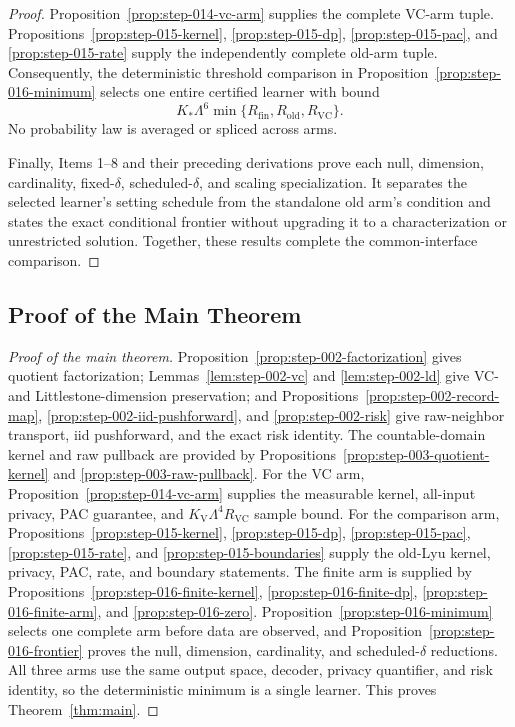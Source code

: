 \begin{proof}
Proposition~\ref{prop:step-014-vc-arm} supplies the complete
VC-arm tuple. Propositions~\ref{prop:step-015-kernel},
\ref{prop:step-015-dp}, \ref{prop:step-015-pac}, and
\ref{prop:step-015-rate} supply the independently complete old-arm tuple.
Consequently, the deterministic threshold comparison in
Proposition~\ref{prop:step-016-minimum} selects one entire certified learner
with bound
\[
 K_*\Lambda^6\min\{R_{\mathrm{fin}},R_{\mathrm{old}},R_{\mathrm{VC}}\}.
\]
No probability law is averaged or spliced across arms.

Finally, Items 1--8 and their preceding derivations prove each null,
dimension, cardinality, fixed-\(\delta\), scheduled-\(\delta\), and scaling
specialization. It separates the selected learner's setting schedule from
the standalone old arm's condition and states the exact conditional frontier
without upgrading it to a characterization or unrestricted solution. Together,
these results complete the common-interface comparison.



\end{proof}

\subsection{Proof of the Main Theorem}\label{app:main-proof}

\begin{proof}[Proof of the main theorem]
Proposition~\ref{prop:step-002-factorization} gives quotient factorization;
Lemmas~\ref{lem:step-002-vc} and \ref{lem:step-002-ld} give VC- and
Littlestone-dimension preservation; and
Propositions~\ref{prop:step-002-record-map},
\ref{prop:step-002-iid-pushforward}, and \ref{prop:step-002-risk} give
raw-neighbor transport, iid pushforward, and the exact risk identity. The
countable-domain kernel and raw pullback are
provided by Propositions~\ref{prop:step-003-quotient-kernel} and
\ref{prop:step-003-raw-pullback}. For the VC arm,
Proposition~\ref{prop:step-014-vc-arm} supplies the measurable kernel,
all-input privacy, PAC guarantee, and
$K_{\mathrm V}\Lambda^4R_{\mathrm{VC}}$ sample bound. For the comparison
arm, Propositions~\ref{prop:step-015-kernel},
\ref{prop:step-015-dp}, \ref{prop:step-015-pac},
\ref{prop:step-015-rate}, and
\ref{prop:step-015-boundaries} supply the old-Lyu kernel, privacy, PAC,
rate, and boundary statements. The finite arm is supplied by
Propositions~\ref{prop:step-016-finite-kernel},
\ref{prop:step-016-finite-dp},
\ref{prop:step-016-finite-arm}, and
\ref{prop:step-016-zero}. Proposition~\ref{prop:step-016-minimum}
selects one complete arm before data are observed, and
Proposition~\ref{prop:step-016-frontier} proves the null, dimension,
cardinality, and scheduled-\(\delta\) reductions. All three arms use the
same output space, decoder, privacy quantifier, and risk identity, so the
deterministic minimum is a single learner. This proves Theorem~\ref{thm:main}.
\end{proof}
